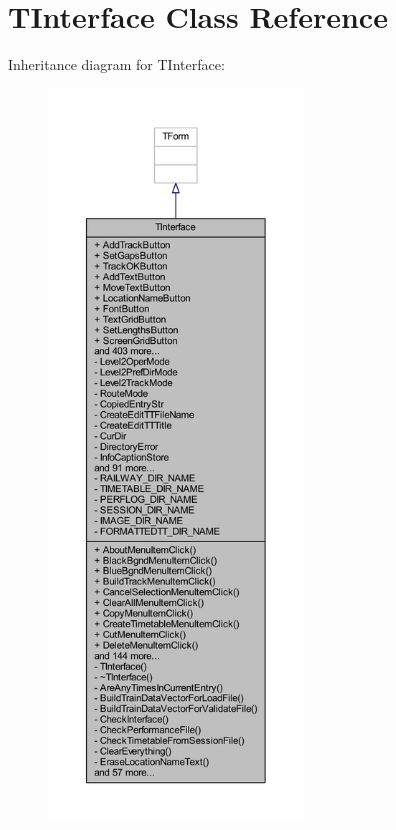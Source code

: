 \hypertarget{class_t_interface}{}\section{T\+Interface Class Reference}
\label{class_t_interface}


Inheritance diagram for T\+Interface\+:
\nopagebreak
\begin{figure}[H]
\begin{center}
\leavevmode
\includegraphics[height=550pt]{class_t_interface__inherit__graph}
\end{center}
\end{figure}


